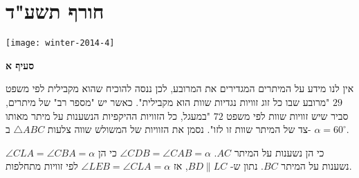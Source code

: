 


\np

\section{חורף תשע"ד}

\begin{center}
\texttt{[image: winter-2014-4]}
\end{center}

\vspace{-2ex}

\textbf{סעיף א}

אין לנו מידע על המיתרים המגדירים את המרובע, לכן ננסה להוכיח שהוא מקבילית לפי משפט
$29$
"מרובע שבו כל זוג זוויות נגדיות שוות הוא מקבילית". כאשר יש "מספר רב" של מיתרים, סביר שיש זוויות שוות לפי משפט
$72$
"במעגל, כל הזוויות ההיקפיות הנשענות על מיתר מאותו צד של המיתר שוות זו לזו". נסמן את הזוויות של המשולש שווה צלעות
$\triangle ABC$
ב-%
$\alpha=60^\circ$.


$\angle CLA=\angle CBA=\alpha$
כי הן נשענות על המיתר
$AC$.
$\angle CDB=\angle CAB=\alpha$
כי הן נשענות על המיתר
$BC$.
נתון ש-%
$BD\|LC$,
אז
$\angle LEB = \angle CLA = \alpha$
לפי זוויות מתחלפות.

